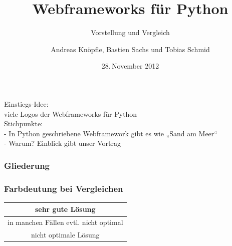 \documentclass[
    t,
    smaller,
    compress,
]{beamer}
\title{Webframeworks für Python}
\subtitle{Vorstellung und Vergleich}
\author{Andreas Knöpfle, Bastien Sachs und Tobias Schmid}
\institute{Institut für Informatik}
\date{28.\,November 2012}
\begin{document}
{
\begin{frame} %
    \titlepage
\end{frame}
}


\begin{frame}
  Einstiegs-Idee:\\
  viele Logos der Webframeworks für Python\\
  Stichpunkte:\\
   - In Python geschriebene Webframework gibt es wie „Sand am Meer“\\
   - Warum? Einblick gibt unser Vortrag\\
\end{frame}


\begin{frame}
  \frametitle{Gliederung}
  \tableofcontents
\end{frame}

\begin{frame}
	
	\frametitle{Farbdeutung bei Vergleichen}
	
	\begin{table}[h]
		\begin{tabular}{|c|}
			\hline
			 \cellcolor{dkgreen} sehr gute Lösung  \\ \hline
		  	\cellcolor{orange} in manchen Fällen evtl. nicht optimal \\ \hline 
		  	\cellcolor{red} nicht optimale Lösung \\ \hline 
		 \end{tabular}
	\end{table}
	
\end{frame}
\end{document}
